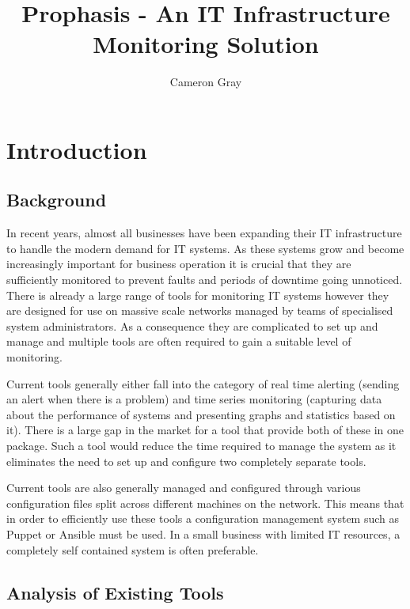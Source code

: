 \documentclass[bsc,logo,twoside,parskip,singlespacing,notimes]{infthesis}
\title{Prophasis - An IT Infrastructure Monitoring Solution}
\author{Cameron Gray}
\begin{document}
\maketitle
\tableofcontents


\chapter{Introduction}
\section{Background}

	In recent years, almost all businesses have been expanding their IT
	infrastructure to handle the modern demand for IT systems.  As these systems
	grow and become increasingly important for business operation it is crucial
	that they are sufficiently monitored to prevent faults and periods of downtime
	going unnoticed.  There is already a large range of tools for monitoring IT
	systems however they are  designed for use on massive scale networks managed by
	teams of specialised system administrators.  As a consequence they are
	complicated to set up and manage and multiple tools are often required to gain
	a suitable level of monitoring.


	Current tools generally either fall into the category of real time
	alerting (sending an alert when there is a problem) and time series
	monitoring (capturing data about the performance of systems and presenting
	graphs and statistics based on it). There is a large gap in the market for a
	tool that provide both of these in one package. Such a tool would reduce the
	time required to manage the system as it eliminates the need to set up and
	configure two completely separate tools.


	Current tools are also generally managed and configured through various
	configuration files split across different machines on the network. This means
	that in order to efficiently use these tools a configuration management system
	such as	Puppet or Ansible must be used. In a small business with limited IT
	resources, a completely self contained system is often preferable.

\section{Analysis of Existing Tools}
\label{analysis-of-existing-tools}
\end{document}
